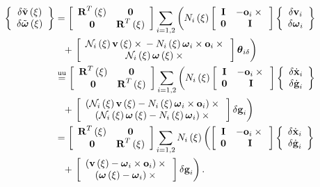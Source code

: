 \begin{align}
	\cubr{\cvvect{
		\delta\tilde{\T{v}}\plbr{\xi} \\
		\delta\tilde{\T{\omega}}\plbr{\xi}
	}}
	&=
	\sqbr{\matr{cc}{
		\TT{R}^T\plbr{\xi} & \TT{0} \\
		\TT{0} & \TT{R}^T\plbr{\xi}
	}} \sum_{i=1,2} \lplbr{
		N_i\plbr{\xi} \sqbr{\matr{cc}{
			\TT{I} & - \T{o}_i \times{} \\
			\TT{0} & \TT{I}
		}} \cubr{\cvvect{
			\delta\T{v}_i \\
			\delta\T{\omega}_i
		}}
	}
	\nonumber \\
	& \hphantom{= } \mbox{}
	+ \rplbr{
		\sqbr{\cvvect{
			\mathcal{N}_i\plbr{\xi} \T{v}\plbr{\xi} \times{}
			- N_i\plbr{\xi} \T{\omega}_i \times \T{o}_i \times{} \\
			\mathcal{N}_i\plbr{\xi} \T{\omega}\plbr{\xi} \times{}
		}} \T{\theta}_{i\delta}
	}
	\nonumber \\
	&\equu
	\sqbr{\matr{cc}{
		\TT{R}^T\plbr{\xi} & \TT{0} \\
		\TT{0} & \TT{R}^T\plbr{\xi}
	}} \sum_{i=1,2} \lplbr{
		N_i\plbr{\xi} \sqbr{\matr{cc}{
			\TT{I} & - \T{o}_i \times{} \\
			\TT{0} & \TT{I}
		}} \cubr{\cvvect{
			\delta\dot{\T{x}}_i \\
			\delta\dot{\T{g}}_i
		}}
	}
	\nonumber \\
	& \hphantom{= } \mbox{}
	+ \rplbr{
		\sqbr{\cvvect{
			\plbr{
				\mathcal{N}_i\plbr{\xi} \T{v}\plbr{\xi}
				- N_i\plbr{\xi} \T{\omega}_i \times \T{o}_i
			} \times{} \\
			\plbr{
				\mathcal{N}_i\plbr{\xi} \T{\omega}\plbr{\xi}
				- N_i\plbr{\xi} \T{\omega}_i
			} \times{}
		}} \delta\T{g}_i
	}
	\nonumber \\
	&=
	\sqbr{\matr{cc}{
		\TT{R}^T\plbr{\xi} & \TT{0} \\
		\TT{0} & \TT{R}^T\plbr{\xi}
	}} \sum_{i=1,2} N_i\plbr{\xi} \lplbr{
		\sqbr{\matr{cc}{
			\TT{I} & - \T{o}_i \times{} \\
			\TT{0} & \TT{I}
		}} \cubr{\cvvect{
			\delta\dot{\T{x}}_i \\
			\delta\dot{\T{g}}_i
		}}
	}
	\nonumber \\
	& \hphantom{= } \mbox{}
	+ \rplbr{
		\sqbr{\cvvect{
			\plbr{
				\T{v}\plbr{\xi}
				- \T{\omega}_i \times \T{o}_i
			} \times{} \\
			\plbr{
				\T{\omega}\plbr{\xi}
				- \T{\omega}_i
			} \times{}
		}} \delta\T{g}_i
	}
	.
\end{align}

